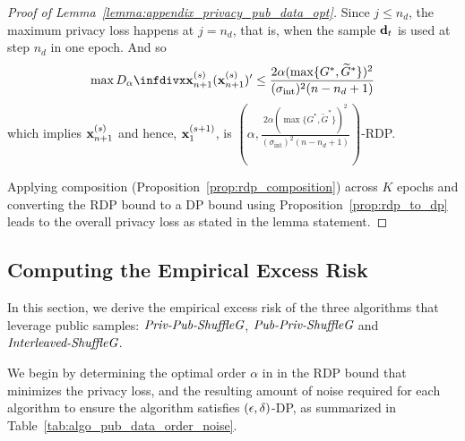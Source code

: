 \begin{proof}[Proof of Lemma~\ref{lemma:appendix_privacy_pub_data_opt}]
    Since $j \leq n_d$, the maximum privacy loss happens at $j = n_d$, that is, when the sample ${\mathbf{d}}_t$ is used at step $n_d$ in one epoch. And so
    \begin{align*}
        \max \infdivalpha{\rvx_{n+1}^{(s)}}{(\rvx_{n+1}^{(s)})'}
        \leq \frac{2\alpha (\max\{G^{*}, \widetilde{G}^{*}\})^2}{(\sigma_{\text{int}})^2 (n-n_d+1)}
    \end{align*}
    which implies ${\mathbf{x}}_{n+1}^{(s)}$ and hence, ${\mathbf{x}}_{1}^{(s+1)}$, is $(\alpha, \frac{2\alpha (\max\{G^{*}, \widetilde{G}^{*}\})^2}{(\sigma_{\text{int}})^2 (n-n_d+1)} )$-RDP.

    Applying composition (Proposition~\ref{prop:rdp_composition}) across $K$ epochs and converting the RDP bound to a DP bound using Proposition~\ref{prop:rdp_to_dp} leads to the overall privacy loss as stated in the lemma statement.

\end{proof}



\subsection{Computing the Empirical Excess Risk}
\label{subsec:appendix_algo_pub_data_risk}

In this section, we derive the empirical excess risk of the three algorithms that leverage public samples: $\textit{Priv-Pub-ShuffleG}$, $\textit{Pub-Priv-ShuffleG}$ and $\textit{Interleaved-ShuffleG}$.

We begin by determining the optimal order $\alpha$ in in the RDP bound that minimizes the privacy loss, and the resulting amount of noise required for each algorithm to ensure the algorithm satisfies $({\epsilon}, \delta)$-DP, as summarized in Table~\ref{tab:algo_pub_data_order_noise}.

